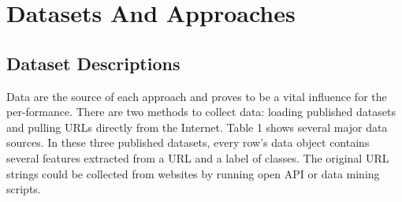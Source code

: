 \documentclass[final]{cvpr}
\begin{document}
\section{Datasets And Approaches}

\subsection{Dataset Descriptions}

Data are the source of each approach and proves to be a vital influence for the per-formance. There are two methods to collect data: loading published datasets and pulling
URLs directly from the Internet. Table 1 shows several major data sources. In these three
published datasets, every row’s data object contains several features extracted from a URL
and a label of classes. The original URL strings could be collected from websites by running
open API or data mining scripts.
\end{document}
